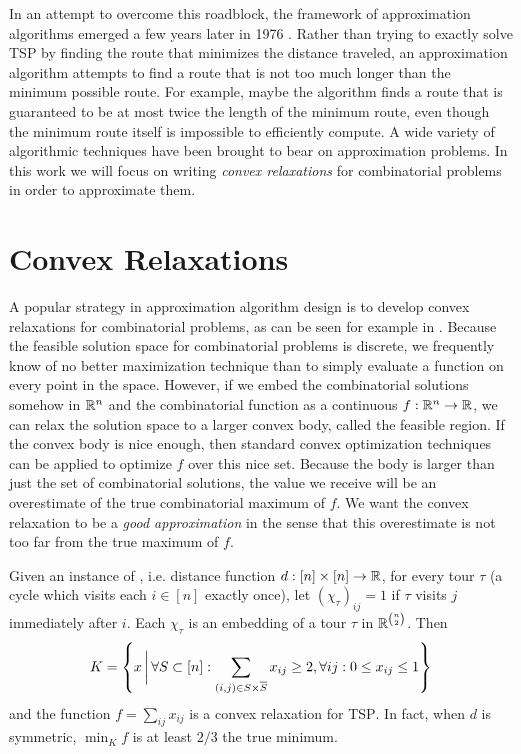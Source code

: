 In an attempt to overcome this roadblock, the framework of approximation algorithms emerged a few years later in 1976 \cite{SG76}. Rather than trying to exactly solve \textsc{TSP} by finding the route that minimizes the distance traveled, an approximation algorithm attempts to find a route that is not too much longer than the minimum possible route. For example, maybe the algorithm finds a route that is guaranteed to be at most twice the length of the minimum route, even though the minimum route itself is impossible to efficiently compute. A wide variety of algorithmic techniques have been brought to bear on approximation problems. In this work we will focus on writing \emph{convex relaxations} for combinatorial problems in order to approximate them.

\section{Convex Relaxations}
A popular strategy in approximation algorithm design is to develop convex relaxations for combinatorial problems, as can be seen for example in \cite{GW95,VY99,ARV09,Li13}.
Because the feasible solution space for combinatorial problems is discrete, we frequently know of no better maximization technique than to simply evaluate a function on every point in the space. However, if we embed the combinatorial solutions somehow in $\mathbb R^n$ and the combinatorial function as a continuous $f: \mathbb R^n \rightarrow \mathbb R$, we can relax the solution space to a larger convex body, called the feasible region. If the convex body is nice enough, then standard convex optimization techniques can be applied to optimize $f$ over this nice set. Because the body is larger than just the set of combinatorial solutions, the value we receive will be an overestimate of the true combinatorial maximum of $f$. We want the convex relaxation to be a \emph{good approximation} in the sense that this overestimate is not too far from the true maximum of $f$.

\begin{example}
Given an instance of , i.e. distance function $d: [n] \times [n] \rightarrow \mathbb R$, for every tour $\tau$ (a cycle which visits each $i \in [n]$ exactly once), let $(\chi_\tau)_{ij} = 1$ if $\tau$ visits $j$ immediately after $i$. Each $\chi_\tau$ is an embedding of a tour $\tau$ in $\mathbb R^{\binom{n}{2}}$. Then
\[K = \left\{x \, \bigg{|} \, \forall S \subset [n]: \sum_{(i,j) \in S \times \overline{S}} x_{ij} \geq 2, \forall ij: 0 \leq x_{ij} \leq 1\right\}\]
and the function $f = \sum_{ij} x_{ij}$ is a convex relaxation for \textsc{TSP}. In fact, when $d$ is symmetric, $\min_K f$ is at least $2/3$ the true minimum.
\end{example}

